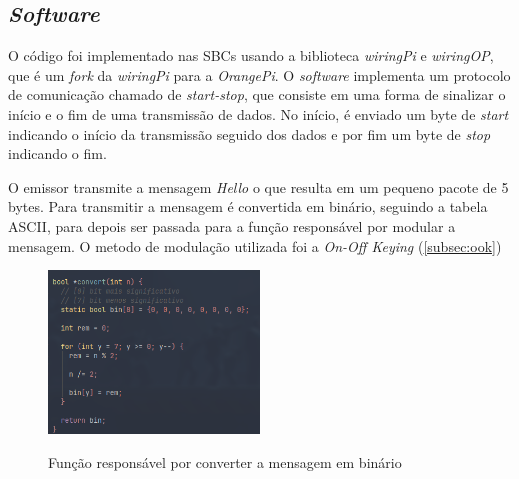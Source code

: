\subsection{\textit{Software}}

O código foi implementado nas SBCs usando a biblioteca \textit{wiringPi} e \textit{wiringOP}, que é um \textit{fork} da \textit{wiringPi} para a \textit{OrangePi}. O \textit{software} implementa um protocolo de comunicação chamado de \textit{start-stop}, que consiste em uma forma de sinalizar o início e o fim de uma transmissão de dados. No início, é enviado um byte de \textit{start} indicando o início da transmissão seguido dos dados e por fim um byte de \textit{stop} indicando o fim.

O emissor transmite a mensagem \textit{Hello} o que resulta em um pequeno pacote de 5 bytes. Para transmitir a mensagem é convertida em binário, seguindo a tabela ASCII, para depois ser passada para a função responsável por modular a mensagem. O metodo de modulação utilizada foi a \textit{On-Off Keying} (\autoref{subsec:ook})

\begin{figure}[!htbp]
  \caption{Função responsável por converter a mensagem em binário}
  \includegraphics[width=0.5\textwidth]{images/convert_emissor.png}
  \label{convert_emissor}
\end{figure}


